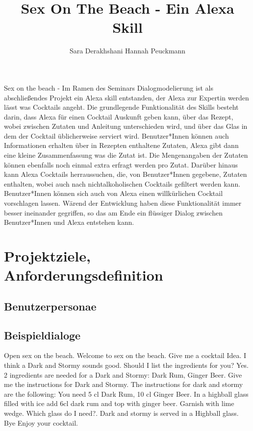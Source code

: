 \documentclass[12pt,letterpaper]{article}
\begin{document}
\title{Sex On The Beach - Ein Alexa Skill}
\author{Sara Derakhshani Hannah Peuckmann}
\maketitle
\thispagestyle{fancy}

Sex on the beach - Im Ramen des Seminars Dialogmodelierung ist als abschließendes Projekt ein
Alexa skill entstanden, der Alexa zur Expertin werden lässt was Cocktails angeht.
Die grundlegende Funktionalität des Skills besteht darin, dass Alexa für einen Cocktail Auskunft geben kann,
über das Rezept, wobei zwischen Zutaten und Anleitung unterschieden wird, und über das Glas in dem der Cocktail
üblicherweise serviert wird. Benutzer*Innen können auch Informationen erhalten über in Rezepten enthaltene Zutaten,
Alexa gibt dann eine kleine Zusammenfassung was die Zutat ist. Die Mengenangaben der Zutaten können ebenfalls noch einmal extra erfragt werden pro Zutat.
Darüber hinaus kann Alexa Cocktails herraussuchen, die, von Benutzer*Innen
gegebene, Zutaten enthalten, wobei auch nach nichtalkoholischen Cocktails gefiltert werden kann. 
Benutzer*Innen können sich auch von Alexa einen willkürlichen Cocktail vorschlagen lassen.
Wärend der Entwicklung haben diese Funktionalität immer besser ineinander gegriffen, so das am Ende ein flüssiger Dialog
zwischen Benutzer*Innen und Alexa entstehen kann.

\section{Projektziele, Anforderungsdefinition}
\subsection{Benutzerpersonae}

\subsection{Beispieldialoge}
\begin{dialogue}
	 Open sex on the beach.
	 Welcome to sex on the beach.
	 Give me a cocktail Idea.
	 I think a Dark and Stormy sounds good. Should I list the ingredients for you?
	 Yes.
	 2 ingredients are needed for a Dark and Stormy: Dark Rum, Ginger Beer.
	 Give me the instructions for Dark and Stormy.
	 The instructions for dark and stormy are the following: You need 5 cl Dark Rum, 10 cl Ginger Beer. In a highball glass filled with ice add 6cl dark rum and top with ginger beer. Garnish with lime wedge.
	 Which glass do I need?.
	 Dark and stormy is served in a Highball glass.
	 Bye
	 Enjoy your cocktail.
\end{dialogue}
\end{document}
